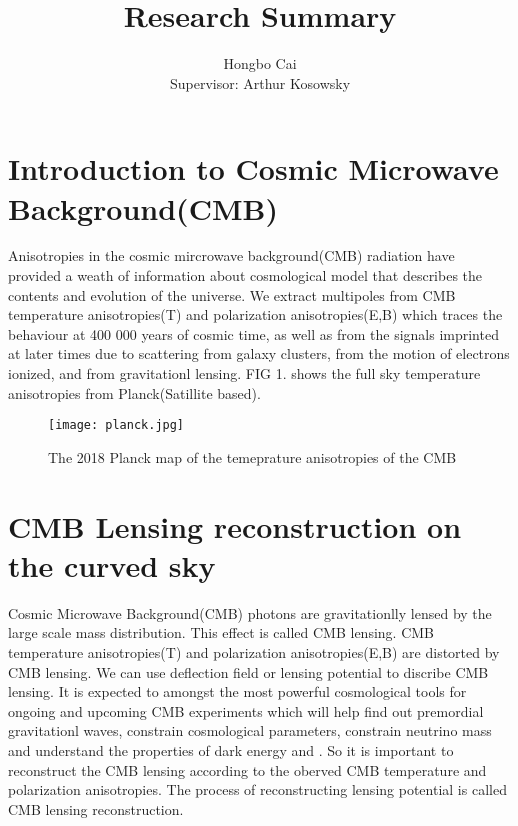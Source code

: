 \documentclass[12pt, notitlepage, onecolumn, amsmath, amssymb, aps]{revtex4-1}
\title{}
\begin{document}
\title{Research Summary}
\author{Hongbo Cai \\{\small Supervisor: Arthur Kosowsky}}
\maketitle
\newcommand{\edit}[1]{\textcolor{red}{(#1)}}
\vspace{-1.5cm}
\section{Introduction to Cosmic Microwave Background(CMB)}
\label{sec:org8852578}

Anisotropies in the cosmic mircrowave background(CMB) radiation have provided a weath of information about cosmological model that describes the contents and evolution of the universe\cite{Staggs:2018gvf}. We extract multipoles from CMB temperature anisotropies(T) and polarization anisotropies(E,B) which traces the behaviour at 400 000 years of cosmic time, as well as from the signals imprinted at later times due to scattering from galaxy clusters, from the motion of electrons ionized, and from gravitationl lensing. FIG 1. shows the full sky temperature anisotropies from Planck(Satillite based).
\begin{figure}[h]
\texttt{[image: planck.jpg]}
\caption{The 2018 Planck map of the temeprature anisotropies of the CMB}
\end{figure}


\section{CMB Lensing reconstruction on the curved sky}
\label{sec:org8852578}


Cosmic Microwave Background(CMB) photons are gravitationlly lensed by the large scale mass distribution. This effect is called CMB lensing. CMB temperature anisotropies(T) and polarization anisotropies(E,B) are distorted by CMB lensing. We can use deflection field or lensing potential to discribe CMB lensing\cite{Lewis:2006fu}. It is expected to amongst the most powerful cosmological tools for ongoing and upcoming CMB experiments which will help find out premordial gravitationl waves, constrain cosmological parameters, constrain neutrino mass and understand the properties of dark energy and . So it is important to reconstruct the CMB lensing according to the oberved CMB temperature and polarization anisotropies. The process of reconstructing lensing potential is called CMB lensing reconstruction.
\end{document}
